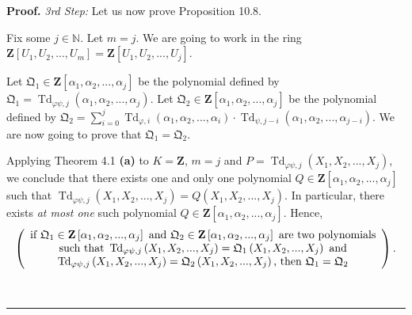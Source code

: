 \documentclass[numbers=enddot,12pt,final,onecolumn,notitlepage]{scrartcl}%
\newenvironment{proof}[1][Proof]{\noindent\textbf{#1.} }{\ \rule{0.5em}{0.5em}}
\begin{document}
\begin{proof}
\textit{3rd Step:} Let us now prove Proposition 10.8.

Fix some $j\in\mathbb{N}$. Let $m=j$. We are going to work in the ring
$\mathbf{Z}\left[  U_{1},U_{2},...,U_{m}\right]  =\mathbf{Z}\left[
U_{1},U_{2},...,U_{j}\right]  $.

Let $\mathfrak{Q}_{1}\in\mathbf{Z}\left[  \alpha_{1},\alpha_{2},...,\alpha
_{j}\right]  $ be the polynomial defined by $\mathfrak{Q}_{1}%
=\operatorname*{Td}\nolimits_{\varphi\psi,j}\left(  \alpha_{1},\alpha
_{2},...,\alpha_{j}\right)  $. Let $\mathfrak{Q}_{2}\in\mathbf{Z}\left[
\alpha_{1},\alpha_{2},...,\alpha_{j}\right]  $ be the polynomial defined by
$\mathfrak{Q}_{2}=\sum\limits_{i=0}^{j}\operatorname*{Td}\nolimits_{\varphi
,i}\left(  \alpha_{1},\alpha_{2},...,\alpha_{i}\right)  \cdot
\operatorname*{Td}\nolimits_{\psi,j-i}\left(  \alpha_{1},\alpha_{2}%
,...,\alpha_{j-i}\right)  $. We are now going to prove that $\mathfrak{Q}%
_{1}=\mathfrak{Q}_{2}$.

Applying Theorem 4.1 \textbf{(a)} to $K=\mathbf{Z}$, $m=j$ and
$P=\operatorname*{Td}\nolimits_{\varphi\psi,j}\left(  X_{1},X_{2}%
,...,X_{j}\right)  $, we conclude that there exists one and only one
polynomial $Q\in\mathbf{Z}\left[  \alpha_{1},\alpha_{2},...,\alpha_{j}\right]
$ such that $\operatorname*{Td}\nolimits_{\varphi\psi,j}\left(  X_{1}%
,X_{2},...,X_{j}\right)  =Q\left(  X_{1},X_{2},...,X_{j}\right)  $. In
particular, there exists \textit{at most one} such polynomial $Q\in
\mathbf{Z}\left[  \alpha_{1},\alpha_{2},...,\alpha_{j}\right]  $. Hence,
\begin{equation}
\left(
\begin{array}
[c]{c}%
\text{if }\mathfrak{Q}_{1}\in\mathbf{Z}\left[  \alpha_{1},\alpha
_{2},...,\alpha_{j}\right]  \text{ and }\mathfrak{Q}_{2}\in\mathbf{Z}\left[
\alpha_{1},\alpha_{2},...,\alpha_{j}\right]  \text{ are two polynomials}\\
\text{such that }\operatorname*{Td}\nolimits_{\varphi\psi,j}\left(
X_{1},X_{2},...,X_{j}\right)  =\mathfrak{Q}_{1}\left(  X_{1},X_{2}%
,...,X_{j}\right)  \text{ and}\\
\operatorname*{Td}\nolimits_{\varphi\psi,j}\left(  X_{1},X_{2},...,X_{j}%
\right)  =\mathfrak{Q}_{2}\left(  X_{1},X_{2},...,X_{j}\right)  \text{, then
}\mathfrak{Q}_{1}=\mathfrak{Q}_{2}%
\end{array}
\right)  . \label{10.8.pf.2}%
\end{equation}



\end{proof}
\end{document}
